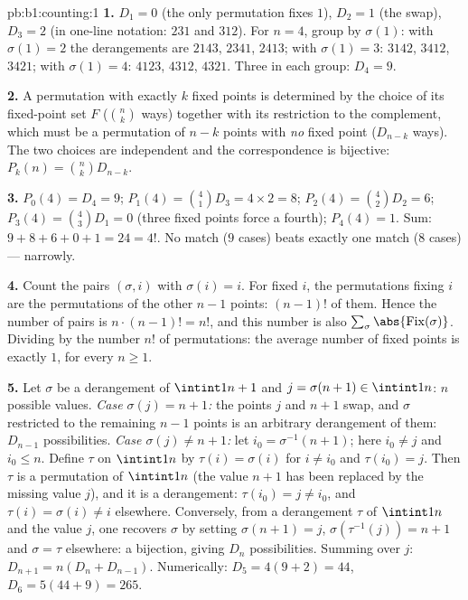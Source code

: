 \begin{solution}{pb:b1:counting:1}
\textbf{1.} $D_1 = 0$ (the only permutation fixes $1$), $D_2 = 1$
(the swap), $D_3 = 2$ (in one-line notation: $231$ and $312$). For
$n = 4$, group by $\sigma(1)$: with $\sigma(1) = 2$ the derangements
are $2143$, $2341$, $2413$; with $\sigma(1) = 3$: $3142$, $3412$,
$3421$; with $\sigma(1) = 4$: $4123$, $4312$, $4321$. Three in each
group: $D_4 = 9$.

\textbf{2.} A permutation with exactly $k$ fixed points is
determined by the choice of its fixed-point set $F$ ($\binom nk$
ways) together with its restriction to the complement, which must
be a permutation of $n - k$ points with \emph{no} fixed point
($D_{n-k}$ ways). The two choices are independent and the
correspondence is bijective: $P_k(n) = \binom nk D_{n-k}$.

\textbf{3.} $P_0(4) = D_4 = 9$; $P_1(4) = \binom41 D_3 = 4 \times 2
= 8$; $P_2(4) = \binom42 D_2 = 6$; $P_3(4) = \binom43 D_1 = 0$
(three fixed points force a fourth); $P_4(4) = 1$. Sum: $9 + 8 + 6
+ 0 + 1 = 24 = 4!$. No match ($9$ cases) beats exactly one match
($8$ cases) --- narrowly.

\textbf{4.} Count the pairs $(\sigma, i)$ with $\sigma(i) = i$. For
fixed $i$, the permutations fixing $i$ are the permutations of the
other $n - 1$ points: $(n-1)!$ of them. Hence the number of pairs
is $n \cdot (n-1)! = n!$, and this number is also
$\sum_\sigma \abs{\mathrm{Fix}(\sigma)}$. Dividing by the number
$n!$ of permutations: the average number of fixed points is
exactly $1$, for every $n \geq 1$.

\textbf{5.} Let $\sigma$ be a derangement of $\intint1{n+1}$ and
$j = \sigma(n+1) \in \intint1n$: $n$ possible values. \emph{Case
$\sigma(j) = n+1$:} the points $j$ and $n+1$ swap, and $\sigma$
restricted to the remaining $n - 1$ points is an arbitrary
derangement of them: $D_{n-1}$ possibilities. \emph{Case $\sigma(j)
\neq n+1$:} let $i_0 = \sigma^{-1}(n+1)$; here $i_0 \neq j$ and
$i_0 \leq n$. Define $\tau$ on $\intint1n$ by $\tau(i) = \sigma(i)$
for $i \neq i_0$ and $\tau(i_0) = j$. Then $\tau$ is a permutation
of $\intint1n$ (the value $n+1$ has been replaced by the missing
value $j$), and it is a derangement: $\tau(i_0) = j \neq i_0$, and
$\tau(i) = \sigma(i) \neq i$ elsewhere. Conversely, from a
derangement $\tau$ of $\intint1n$ and the value $j$, one recovers
$\sigma$ by setting $\sigma(n+1) = j$, $\sigma(\tau^{-1}(j)) = n+1$
and $\sigma = \tau$ elsewhere: a bijection, giving $D_n$
possibilities. Summing over $j$: $D_{n+1} = n(D_n + D_{n-1})$.
Numerically: $D_5 = 4(9 + 2) = 44$, $D_6 = 5(44 + 9) = 265$.


\end{solution}
